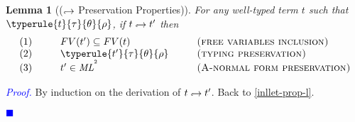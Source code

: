 \documentclass[a4paper,11pt,oneside]{article}
\theoremstyle{plain}
\newtheorem{lemma}[definition]{Lemma}
\renewenvironment{proof}{\noindent \begin{adjustwidth}{1.5em}{} \textcolor{blue}{\textit{Proof.}}}
{{\begin{tiny}\textcolor{blue}{$\blacksquare$}\end{tiny}}
\end{adjustwidth}~\\\noindent}
\newcommand{\tmlet}[3]{let~#1=#2~in~#3}
\newcommand{\tmsbst}[3]{#1 [#2 \mapsfrom #3] }
\newcommand{\bth}{\bot_\theta}
\newcommand{\brh}{\bot_\rho}
\newcommand{\inlsrc}{\textit{ML}^{^2}}
\newcommand{\inlT}{\inlsrc}
\newcommand{\hookdownarrow}{\mathrel{\rotatebox[origin=c]{180}{$\hookleftarrow$}}}
\newcommand{\inlletarr}{\hookdownarrow}
\newcommand{\inllet}[2]{#1 \hookdownarrow #2}
\begin{document}
\begin{lemma}[($\inlletarr$ Preservation Properties)]
For any well-typed term $t$ such that\\ $\typerule{t}{\tau}{\theta}{\rho}$, if $\inllet{t}{t'}$ then
\begin{displaymath}
\begin{array}{l@{\hspace*{1cm}}l@{\hspace*{1cm}}l}
	(1)& FV(t') \subseteq FV(t) & \textsc{(free variables inclusion)} \\
	(2)& \typerule{t'}{\tau}{\theta}{\rho} &\textsc{(typing preservation)} \\
	(3)& t' \in \inlT & \textsc{(A-normal form preservation)}
\end{array}
\end{displaymath}
 \label{inllet-prop-p}
\end{lemma}

\begin{proof}
 By induction on the derivation of $\inllet{t}{t'}$.
 \label{TODO-inllet-prop-p}
 Back to \ref{inllet-prop-l}.
 \end{proof}	
	
%
%	
%
%	
%
	
\end{document}

